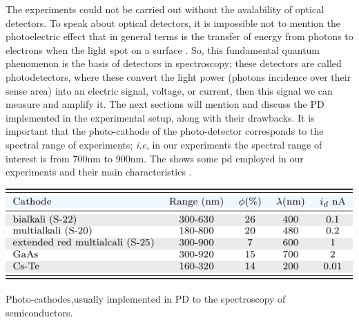 The experiments could not be carried out without the avalability of optical detectors.  To speak about optical detectors, it is impossible not to mention the photoelectric effect that in general terms is the transfer of energy from photons to electrons
when the light spot on a surface \cite{einstein1905uber}. So, this fundamental quantum phenomenon is the
basis of detectors in spectroscopy; these detectors are called photodetectors, where these convert the light power (photons incidence over their sense area) into an electric signal, voltage, or current, then this signal we can measure and amplify it. The next sections will mention and discuss the PD implemented in the experimental setup, along with their drawbacks.
It is important that the photo-cathode of the photo-detector corresponds to the spectral range of experiments; \textit{i.e}, in our experiments the spectral range of interest is from 700nm to 900nm. The shows some \gls{pd} employed in our experiments and their main characteristics \cite{tkachenko2006opticalspectroscopy}.
\begin{table}[b!]
	\centering
	\includegraphics[width=\textwidth]{../tables/chapter-3/table-photodetectors/out/photodetectors.pdf}
	\caption{Photo-cathodes,usually implemented in PD to the spectroscopy of semiconductors\cite{tkachenko2006opticalspectroscopy}. }
	\label{tab:chapter-3-section-samples-photodectors-materials}
\end{table}


